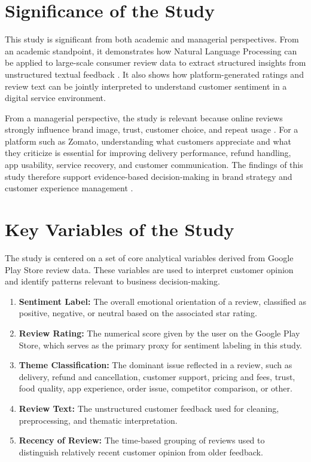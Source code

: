 \section{Significance of the Study}

This study is significant from both academic and managerial perspectives. From an academic standpoint, it demonstrates how Natural Language Processing can be applied to large-scale consumer review data to extract structured insights from unstructured textual feedback \cite{pang2008,liu2012}. It also shows how platform-generated ratings and review text can be jointly interpreted to understand customer sentiment in a digital service environment.

From a managerial perspective, the study is relevant because online reviews strongly influence brand image, trust, customer choice, and repeat usage \cite{chevalier2006,filieri2015}. For a platform such as Zomato, understanding what customers appreciate and what they criticize is essential for improving delivery performance, refund handling, app usability, service recovery, and customer communication. The findings of this study therefore support evidence-based decision-making in brand strategy and customer experience management \cite{lemon2016,verhoef2010,keller2013}.

\section{Key Variables of the Study}

The study is centered on a set of core analytical variables derived from Google Play Store review data. These variables are used to interpret customer opinion and identify patterns relevant to business decision-making.

\begin{enumerate}[label=\arabic*.]
    \item \textbf{Sentiment Label:} The overall emotional orientation of a review, classified as positive, negative, or neutral based on the associated star rating.
    \item \textbf{Review Rating:} The numerical score given by the user on the Google Play Store, which serves as the primary proxy for sentiment labeling in this study.
    \item \textbf{Theme Classification:} The dominant issue reflected in a review, such as delivery, refund and cancellation, customer support, pricing and fees, trust, food quality, app experience, order issue, competitor comparison, or other.
    \item \textbf{Review Text:} The unstructured customer feedback used for cleaning, preprocessing, and thematic interpretation.
    \item \textbf{Recency of Review:} The time-based grouping of reviews used to distinguish relatively recent customer opinion from older feedback.
\end{enumerate}

